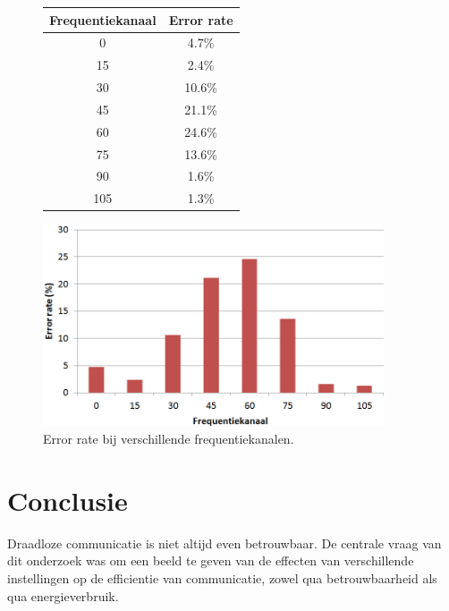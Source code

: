 \documentclass[a4paper,10pt]{article}
\begin{document}
\begin{figure}[h!]
    \begin{minipage}{\textwidth}
        \begin{minipage}{0.49\textwidth}
            \centering
            \begin{tabular}{cc} \hline
                Frequentiekanaal    &  Error rate   \\ \hline
                0                   &  4.7\%        \\
                15                  &  2.4\%        \\
                30                  &  10.6\%       \\
                45                  &  21.1\%       \\
                60                  &  24.6\%       \\
                75                  &  13.6\%       \\
                90                  &  1.6\%        \\
                105                 &  1.3\%        \\ \hline
            \end{tabular}
        \end{minipage}
        \hfill
        \begin{minipage}{0.49\textwidth}
            \centering
            \includegraphics[width=0.9\textwidth]{frequentiekanaal.png}
        \end{minipage}
        \caption{Error rate bij verschillende frequentiekanalen.}
        \label{fig:freqkanaal_table}
    \end{minipage}
\end{figure}

\section{Conclusie}
Draadloze communicatie is niet altijd even betrouwbaar. De centrale vraag van dit onderzoek was om een beeld te geven van de effecten van verschillende instellingen op de efficientie van communicatie, zowel qua betrouwbaarheid als qua energieverbruik.
\end{document}
